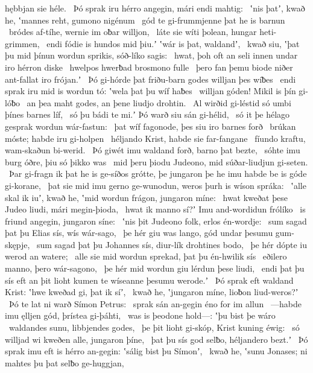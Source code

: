 hębbjan sie héle. \hld\ Þó sprak iru hérro angegin,
mári endi mahtig: \hld\ ʽnis þatʼ, kwað he, ʽmannes reht,
gumono nigénum \hld\ gód te gi-frummjenne
þat he is barnun \hld\ bródes af-tíhe,
wernie im oƀar willjon, \hld\ láte sie wíti þolean,
hungar heti-grimmen, \hld\ endi fódie is hundos mid þiu.ʼ
ʽwár is þat, waldandʼ, \hld\ kwað siu, ʽþat þu mid þínun wordun sprikis,
sóð-líko sagis: \hld\ hwat, þoh oft an seli innen
undar iro hérron diske \hld\ hwelpos hwerƀad
brosmono fulle \hld\ þero fan þemu biode niðer
ant-fallat iro frójan.ʼ \hld\ Þó gi-hórde þat friðu-barn godes
willjan þes wíƀes \hld\ endi sprak iru mid is wordun tó:
ʽwela þat þu wíf haƀes \hld\ willjan góden!
Mikil is þín gi-lóƀo \hld\ an þea maht godes,
an þene liudjo drohtin. \hld\ Al wirðid gi-léstid só
umbi þínes barnes líf, \hld\ só þu bádi te mi.ʼ
Þó warð siu sán gi-hélid, \hld\ só it þe hélago gesprak
wordun wár-fastun: \hld\ þat wíf fagonode,
þes siu iro barnes forð \hld\ brúkan móste;
habde iru gi-holpen \hld\ héljando Krist,
habde sie far-fangane \hld\ fíundo kraftu,
wam-skaðun bi-werid. \hld\ Þó giwét imu waldand forð,
barno þat bezte, \hld\ sóhte imu burg óðre,
þiu só þikko was \hld\ mid þeru þiodu Judeono,
mid súðar-liudjun gi-seten. \hld\ Þar gi-fragn ik þat he is ge-síðos grótte,
þe jungaron þe he imu habde be is góde gi-korane, \hld\ þat sie mid imu gerno ge-wunodun,
weros þurh is wíson spráka: \hld\ ʽalle skal ik iuʼ, kwað he, ʽmid wordun frágon,
jungaron míne: \hld\ hwat kweðat þese Judeo liudi,
mári megin-þioda, \hld\ hwat ik manno sí?ʼ
Imu and-wordidun frólíko \hld\ is friund angegin,
jungaron síne: \hld\ ʽnis þit Judeono folk,
erlos én-wordje: \hld\ sum sagad þat þu Elias sís,
wís wár-sago, \hld\ þe hér giu was lango,
gód undar þesumu gum-skępje, \hld\ sum sagad þat þu Johannes sís,
diur-lík drohtines bodo, \hld\ þe hér dópte iu
werod an watere; \hld\ alle sie mid wordun sprekad,
þat þu én-hwilik sís \hld\ eðilero manno,
þero wár-sagono, \hld\ þe hér mid wordun giu
lérdun þese liudi, \hld\ endi þat þu sís eft an þit lioht kumen
te wíseanne þesumu werode.ʼ \hld\ Þó sprak eft waldand Krist:
ʽhwe kweðad gi, þat ik síʼ, \hld\ kwað he, ʽjungaron míne,
lioƀon liud-weros?ʼ \hld\ Þó te lat ni warð
Símon Petrus: \hld\ sprak sán an-gegin
éno for im allun \hld\ —habde imu ęlljen gód,
þrístea gi-þáhti, \hld\ was is þeodone hold—:
ʽþu bist þe wáro \hld\ waldandes sunu,
libbjendes godes, \hld\ þe þit lioht gi-skóp,
Krist kuning éwig: \hld\ só willjad wi kweðen alle,
jungaron þíne, \hld\ þat þu sís god selƀo,
héljandero bezt.ʼ \hld\ Þó sprak imu eft is hérro an-gegin:
ʽsálig bist þu Símonʼ, \hld\ kwað he, ʽsunu Jonases; ni mahtes þu þat selƀo ge-huggjan,
